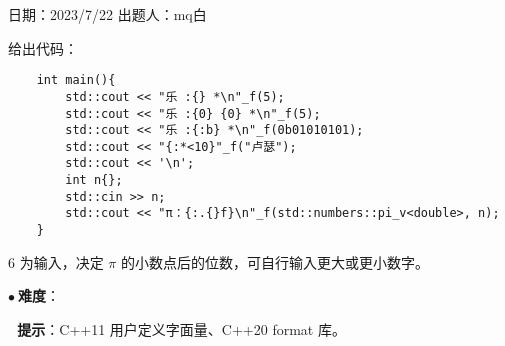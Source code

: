 日期：2023/7/22 出题人：mq白

给出代码：

\begin{verbatim}
    int main(){
        std::cout << "乐 :{} *\n"_f(5);
        std::cout << "乐 :{0} {0} *\n"_f(5);
        std::cout << "乐 :{:b} *\n"_f(0b01010101);
        std::cout << "{:*<10}"_f("卢瑟");
        std::cout << '\n';
        int n{};
        std::cin >> n;
        std::cout << "π：{:.{}f}\n"_f(std::numbers::pi_v<double>, n);
    }
\end{verbatim}

6 为输入，决定 \textbf{$\pi$} 的小数点后的位数，可自行输入更大或更小数字。

$\bullet ~ $\textbf{难度}：    

$~~~$\textbf{提示}：C++11 用户定义字面量、C++20 format 库。